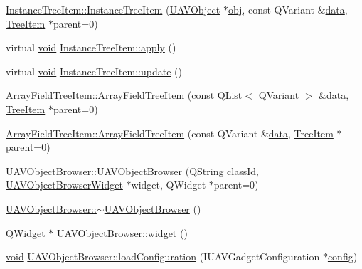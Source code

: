 \begin{DoxyCompactItemize}
\item 
\hyperlink{group___u_a_v_object_browser_plugin_ga1bcb15718988cc4a3a33c7ff85c7c00d}{Instance\-Tree\-Item\-::\-Instance\-Tree\-Item} (\hyperlink{class_u_a_v_object}{U\-A\-V\-Object} $\ast$\hyperlink{glext_8h_a0c0d4701a6c89f4f7f0640715d27ab26}{obj}, const Q\-Variant \&\hyperlink{glext_8h_a8850df0785e6fbcc2351af3b686b8c7a}{data}, \hyperlink{class_tree_item}{Tree\-Item} $\ast$parent=0)
\item 
virtual \hyperlink{group___u_a_v_objects_plugin_ga444cf2ff3f0ecbe028adce838d373f5c}{void} \hyperlink{group___u_a_v_object_browser_plugin_gafd9da1af77e6f69ebd81764de23cc4c0}{Instance\-Tree\-Item\-::apply} ()
\item 
virtual \hyperlink{group___u_a_v_objects_plugin_ga444cf2ff3f0ecbe028adce838d373f5c}{void} \hyperlink{group___u_a_v_object_browser_plugin_ga2f98ddf82fa4ee89c654de207ba2f551}{Instance\-Tree\-Item\-::update} ()
\item 
\hyperlink{group___u_a_v_object_browser_plugin_gac1bacf7300e5dcaad4bb7da856408a99}{Array\-Field\-Tree\-Item\-::\-Array\-Field\-Tree\-Item} (const \hyperlink{class_q_list}{Q\-List}$<$ Q\-Variant $>$ \&\hyperlink{glext_8h_a8850df0785e6fbcc2351af3b686b8c7a}{data}, \hyperlink{class_tree_item}{Tree\-Item} $\ast$parent=0)
\item 
\hyperlink{group___u_a_v_object_browser_plugin_gaa011115b44f5875931af40aa93a80e97}{Array\-Field\-Tree\-Item\-::\-Array\-Field\-Tree\-Item} (const Q\-Variant \&\hyperlink{glext_8h_a8850df0785e6fbcc2351af3b686b8c7a}{data}, \hyperlink{class_tree_item}{Tree\-Item} $\ast$parent=0)
\item 
\hyperlink{group___u_a_v_object_browser_plugin_ga9723050126ebdcc8952f6190cf8f7dbf}{U\-A\-V\-Object\-Browser\-::\-U\-A\-V\-Object\-Browser} (\hyperlink{group___u_a_v_objects_plugin_gab9d252f49c333c94a72f97ce3105a32d}{Q\-String} class\-Id, \hyperlink{class_u_a_v_object_browser_widget}{U\-A\-V\-Object\-Browser\-Widget} $\ast$widget, Q\-Widget $\ast$parent=0)
\item 
\hyperlink{group___u_a_v_object_browser_plugin_gacacc07d4e73a9da5c6faee7763dde1b4}{U\-A\-V\-Object\-Browser\-::$\sim$\-U\-A\-V\-Object\-Browser} ()
\item 
Q\-Widget $\ast$ \hyperlink{group___u_a_v_object_browser_plugin_ga8ed7f7a3fa9ad46c595ee27903636dfe}{U\-A\-V\-Object\-Browser\-::widget} ()
\item 
\hyperlink{group___u_a_v_objects_plugin_ga444cf2ff3f0ecbe028adce838d373f5c}{void} \hyperlink{group___u_a_v_object_browser_plugin_gaf13947eb936ed7bb3d885d099fcc5ca2}{U\-A\-V\-Object\-Browser\-::load\-Configuration} (I\-U\-A\-V\-Gadget\-Configuration $\ast$\hyperlink{deflate_8c_a4473b5227787415097004fd39f55185e}{config})

\end{DoxyCompactItemize}
